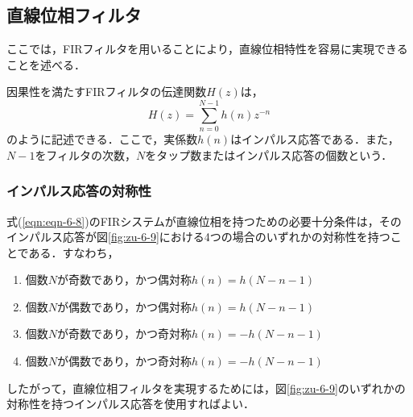\subsection{直線位相フィルタ}

ここでは，FIRフィルタを用いることにより，直線位相特性を容易に実現できることを述べる．

因果性を満たすFIRフィルタの伝達関数$H(z)$は，
\begin{equation}
H(z)=\sum_{n=0}^{N-1}h(n)z^{-n}
\label{eqn:eqn-6-8}
\end{equation}
のように記述できる．ここで，実係数$h(n)$はインパルス応答である．また，$N-1$をフィルタの次数，$N$をタップ数またはインパルス応答の個数という．


\subsubsection{インパルス応答の対称性}

式(\ref{eqn:eqn-6-8})のFIRシステムが直線位相を持つための必要十分条件は，そのインパルス応答が図\ref{fig:zu-6-9}における4つの場合のいずれかの対称性を持つことである．すなわち，
\begin{enumerate}
\item 個数$N$が奇数であり，かつ偶対称$h(n)=h(N-n-1)$
\item 個数$N$が偶数であり，かつ偶対称$h(n)=h(N-n-1)$
\item 個数$N$が奇数であり，かつ奇対称$h(n)=-h(N-n-1)$
\item 個数$N$が偶数であり，かつ奇対称$h(n)=-h(N-n-1)$
\end{enumerate}

したがって，直線位相フィルタを実現するためには，図\ref{fig:zu-6-9}のいずれかの対称性を持つインパルス応答を使用すればよい．

